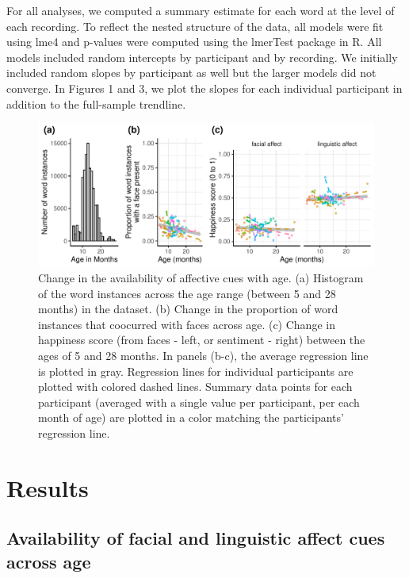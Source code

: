 \documentclass[10pt, letterpaper]{article}
\begin{document}
For all analyses, we computed a summary estimate for each word at the
level of each recording. To reflect the nested structure of the data,
all models were fit using lme4 and p-values were computed using the
lmerTest package in R. All models included random intercepts by
participant and by recording. We initially included random slopes by
participant as well but the larger models did not converge. In Figures 1
and 3, we plot the slopes for each individual participant in addition to
the full-sample trendline.

\begin{CodeChunk}
\begin{figure}[h]

{\centering \includegraphics{figs/figure1-1} 

}

\caption[Change in the availability of affective cues with age]{Change in the availability of affective cues with age. (a) Histogram of the word instances across the age range (between 5 and 28 months) in the dataset. (b) Change in the proportion of word instances that coocurred with faces across age. (c) Change in happiness score (from faces - left, or sentiment - right) between the ages of 5 and 28 months. In panels (b-c), the average regression line is plotted in gray. Regression lines for individual participants are plotted with colored dashed lines. Summary data points for each participant (averaged with a single value per participant, per each month of age) are plotted in a color matching the participants’ regression line.}\label{fig:figure1}
\end{figure}
\end{CodeChunk}

\section{Results}\label{results}

\subsection{Availability of facial and linguistic affect cues across
age}\label{availability-of-facial-and-linguistic-affect-cues-across-age}
\end{document}
